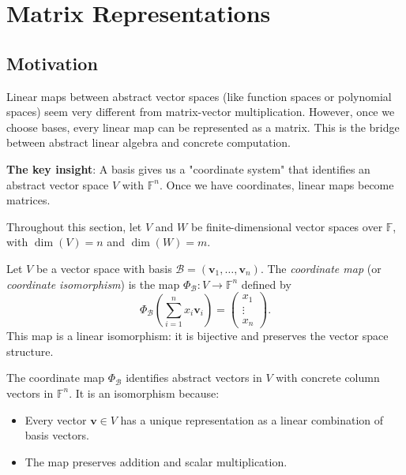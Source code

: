 \section{Matrix Representations}

\subsection{Motivation}

Linear maps between abstract vector spaces (like function spaces or polynomial spaces) seem very different from
matrix-vector multiplication. However, once we choose bases, every linear map can be represented as a matrix.
This is the bridge between abstract linear algebra and concrete computation.

\textbf{The key insight}: A basis gives us a "coordinate system" that identifies an abstract vector space $V$ with $\mathbb{F}^n$.
Once we have coordinates, linear maps become matrices.

Throughout this section, let $V$ and $W$ be finite-dimensional vector spaces over $\mathbb{F}$,
with $\dim(V) = n$ and $\dim(W) = m$.

\begin{definition}
  Let $V$ be a vector space with basis $\mathcal{B} = (\mathbf{v}_1,\dots,\mathbf{v}_n)$.
  The \emph{coordinate map} (or \emph{coordinate isomorphism}) is the map $\Phi_{\mathcal{B}} : V \to \mathbb{F}^n$ defined by
  \begin{equation}
    \Phi_{\mathcal{B}}\left(\sum_{i=1}^{n} x_i \mathbf{v}_i\right) = \begin{pmatrix} x_1 \\ \vdots \\ x_n \end{pmatrix}.
  \end{equation}
  This map is a linear isomorphism: it is bijective and preserves the vector space structure.
\end{definition}

\begin{remark}
  The coordinate map $\Phi_{\mathcal{B}}$ identifies abstract vectors in $V$ with concrete column vectors in $\mathbb{F}^n$.
  It is an isomorphism because:
  \begin{itemize}
    \item Every vector $\mathbf{v} \in V$ has a unique representation as a linear combination of basis vectors.
    \item The map preserves addition and scalar multiplication.
  \end{itemize}
\end{remark}

